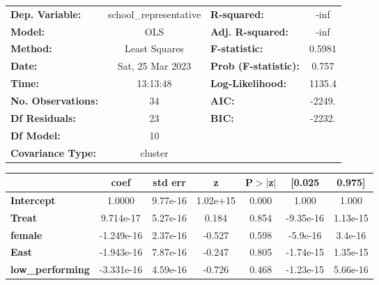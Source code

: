 \begin{center}
\begin{tabular}{lclc}
\toprule
\textbf{Dep. Variable:}       & school\_representative & \textbf{  R-squared:         } &      -inf   \\
\textbf{Model:}               &          OLS           & \textbf{  Adj. R-squared:    } &      -inf   \\
\textbf{Method:}              &     Least Squares      & \textbf{  F-statistic:       } &    0.5981   \\
\textbf{Date:}                &    Sat, 25 Mar 2023    & \textbf{  Prob (F-statistic):} &    0.757    \\
\textbf{Time:}                &        13:13:48        & \textbf{  Log-Likelihood:    } &    1135.4   \\
\textbf{No. Observations:}    &             34         & \textbf{  AIC:               } &    -2249.   \\
\textbf{Df Residuals:}        &             23         & \textbf{  BIC:               } &    -2232.   \\
\textbf{Df Model:}            &             10         & \textbf{                     } &             \\
\textbf{Covariance Type:}     &        cluster         & \textbf{                     } &             \\
\bottomrule
\end{tabular}
\begin{tabular}{lcccccc}
                              & \textbf{coef} & \textbf{std err} & \textbf{z} & \textbf{P$> |$z$|$} & \textbf{[0.025} & \textbf{0.975]}  \\
\midrule
\textbf{Intercept}            &       1.0000  &     9.77e-16     &  1.02e+15  &         0.000        &        1.000    &        1.000     \\
\textbf{Treat}                &    9.714e-17  &     5.27e-16     &     0.184  &         0.854        &    -9.35e-16    &     1.13e-15     \\
\textbf{female}               &   -1.249e-16  &     2.37e-16     &    -0.527  &         0.598        &     -5.9e-16    &      3.4e-16     \\
\textbf{East}                 &   -1.943e-16  &     7.87e-16     &    -0.247  &         0.805        &    -1.74e-15    &     1.35e-15     \\
\textbf{low\_performing}      &   -3.331e-16  &     4.59e-16     &    -0.726  &         0.468        &    -1.23e-15    &     5.66e-16     \\

\end{tabular}
\end{center}
